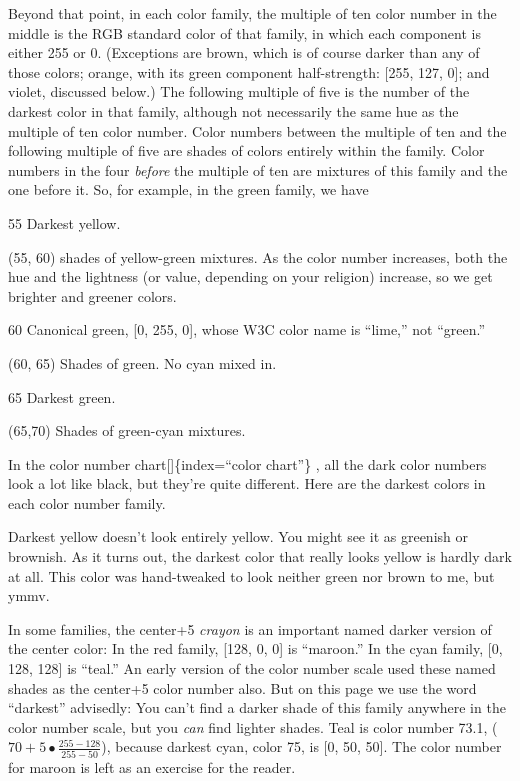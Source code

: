 \documentclass[
  letterpaper,
]{book}
\begin{document}
Beyond that point, in each color family, the multiple of ten color
number in the middle is the RGB standard color of that family, in which
each component is either 255 or 0. (Exceptions are brown, which is of
course darker than any of those colors; orange, with its green component
half-strength: {[}255, 127, 0{]}; and violet, discussed below.) The
following multiple of five is the number of the darkest color in that
family, although not necessarily the same hue as the multiple of ten
color number. Color numbers between the multiple of ten and the
following multiple of five are shades of colors entirely within the
family. Color numbers in the four \emph{before} the multiple of ten are
mixtures of this family and the one before it. So, for example, in the
green family, we have

55 Darkest yellow.

(55, 60) shades of yellow-green mixtures. As the color number increases,
both the hue and the lightness (or value, depending on your religion)
increase, so we get brighter and greener colors.

60 Canonical green, {[}0, 255, 0{]}, whose W3C color name is ``lime,''
not ``green.''

(60, 65) Shades of green. No cyan mixed in.

65 Darkest green.

(65,70) Shades of green-cyan mixtures.

In the color number chart{[}{]}\{index=``color chart''\} , all the dark
color numbers look a lot like black, but they're quite different. Here
are the darkest colors in each color number family.

Darkest yellow doesn't look entirely yellow. You might see it as
greenish or brownish. As it turns out, the darkest color that really
looks yellow is hardly dark at all. This color was hand-tweaked to look
neither green nor brown to me, but ymmv.

In some families, the center+5 \emph{crayon} is an important named
darker version of the center color: In the red family, {[}128, 0, 0{]}
is ``maroon.'' In the cyan family, {[}0, 128, 128{]} is ``teal.'' An
early version of the color number scale used these named shades as the
center+5 color number also. But on this page we use the word ``darkest''
advisedly: You can't find a darker shade of this family anywhere in the
color number scale, but you \emph{can} find lighter shades. Teal is
color number 73.1, (\(70 + 5 \bullet \frac{255 - 128}{255 - 50}\)),
because darkest cyan, color 75, is {[}0, 50, 50{]}. The color number for
maroon is left as an exercise for the reader.
\end{document}
